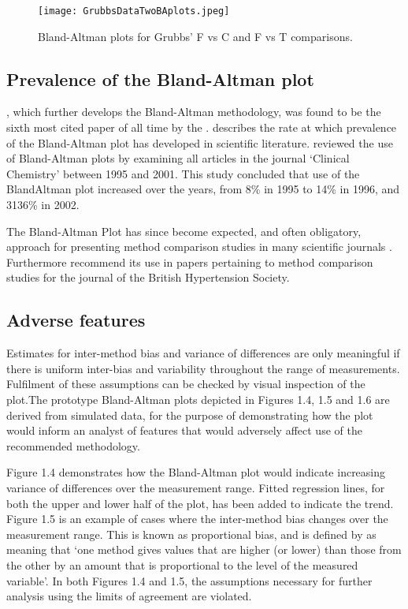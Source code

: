\documentclass[12pt, a4paper]{report}
\begin{document}
	\begin{figure}[h!]
		\begin{center}
			\texttt{[image: GrubbsDataTwoBAplots.jpeg]}
			\caption{Bland-Altman plots for Grubbs' F vs C and F vs T comparisons.}\label{GrubbsDataTwoBAplots}
		\end{center}
	\end{figure}
	
	\newpage
	
	\subsection{Prevalence of the Bland-Altman plot}
	\citet*{BA86}, which further develops the Bland-Altman methodology,
	was found to be the sixth most cited paper of all time by the
	\citet{BAcite}. \cite{Dewitte} describes the rate at which
	prevalence of the Bland-Altman plot has developed in scientific
	literature. \citet{Dewitte} reviewed the use of Bland-Altman plots
	by examining all articles in the journal `Clinical Chemistry'
	between 1995 and 2001. This study concluded that use of the
	BlandAltman plot increased over the years, from 8\% in 1995 to
	14\% in 1996, and 3136\% in 2002.
	
	The Bland-Altman Plot has since become expected, and
	often obligatory, approach for presenting method comparison
	studies in many scientific journals \citep{hollis}. Furthermore
	\citet{BritHypSoc} recommend its use in papers pertaining to
	method comparison studies for the journal of the British
	Hypertension Society.
	
	\subsection{Adverse features}
	
	Estimates for inter-method bias and variance of differences are only meaningful if there is uniform inter-bias and variability throughout the range of measurements. Fulfilment of these assumptions can be checked by visual inspection of the plot.The prototype Bland-Altman plots depicted in Figures 1.4, 1.5 and 1.6 are derived from simulated data, for the purpose of demonstrating how the plot would inform an analyst of features that would adversely affect use of the recommended methodology.
	
	Figure 1.4 demonstrates how the Bland-Altman plot would indicate
	increasing variance of differences over the measurement range.
	Fitted regression lines, for both the upper and lower half of the
	plot, has been added to indicate the trend. Figure 1.5 is an
	example of cases where the inter-method bias changes over the
	measurement range. This is known as proportional bias, and is
	defined by \citet{ludbrook97} as meaning that `one method gives
	values that are higher (or lower) than those from the other by an
	amount that is proportional to the level of the measured
	variable'. In both Figures 1.4 and 1.5, the assumptions necessary
	for further analysis using the limits of agreement are violated.
	
\end{document}
